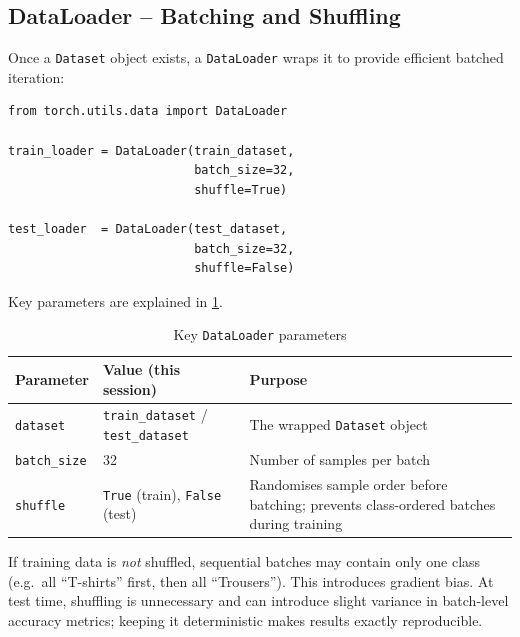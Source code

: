 \documentclass[12pt,a4paper]{article}
\begin{document}
\subsection{DataLoader -- Batching and Shuffling}
\label{subsec:dataloader}

Once a \texttt{Dataset} object exists, a \texttt{DataLoader} wraps it to
provide efficient batched iteration:

\begin{tcolorbox}[colback=gray!5!white, colframe=gray!60!black,
  fonttitle=\bfseries, title=Listing 2: Creating train and test DataLoaders]
\begin{verbatim}
from torch.utils.data import DataLoader

train_loader = DataLoader(train_dataset,
                          batch_size=32,
                          shuffle=True)

test_loader  = DataLoader(test_dataset,
                          batch_size=32,
                          shuffle=False)
\end{verbatim}
\end{tcolorbox}

Key parameters are explained in \cref{tab:dataloader-params}.

\begin{table}[htbp]
  \centering
  \caption{Key \texttt{DataLoader} parameters}
  \label{tab:dataloader-params}
  \begin{tabularx}{\linewidth}{llX}
    \toprule
    \textbf{Parameter} & \textbf{Value (this session)} & \textbf{Purpose} \\
    \midrule
    \texttt{dataset}    & \texttt{train\_dataset} / \texttt{test\_dataset} &
      The wrapped \texttt{Dataset} object \\
    \texttt{batch\_size} & 32 &
      Number of samples per batch \\
    \texttt{shuffle}    & \texttt{True} (train), \texttt{False} (test) &
      Randomises sample order before batching; prevents class-ordered batches
      during training \\
    \bottomrule
  \end{tabularx}
\end{table}

\begin{keyinsight}[title=Why shuffle training data but not test data?]
If training data is \emph{not} shuffled, sequential batches may contain only
one class (e.g.\ all ``T-shirts'' first, then all ``Trousers'').  This
introduces gradient bias.  At test time, shuffling is unnecessary and can
introduce slight variance in batch-level accuracy metrics; keeping it
deterministic makes results exactly reproducible.
\end{keyinsight}
\end{document}
